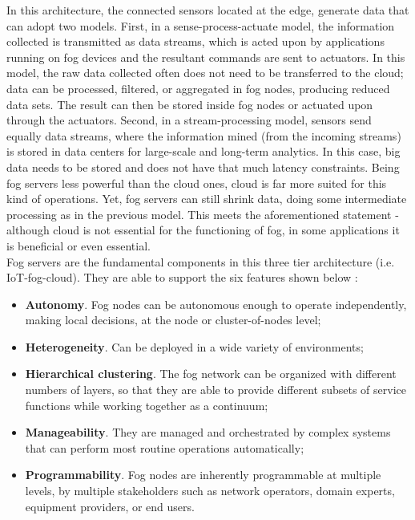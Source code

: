 \noindent\tab In this architecture, the connected sensors located at the edge, generate data that can adopt two models. First, in a sense-process-actuate model, the information collected is transmitted as data streams, which is acted upon by applications running on fog devices and the resultant commands are sent to actuators. In this model, the raw data collected often does not need to be transferred to the cloud; data can be processed, filtered, or aggregated in fog nodes, producing reduced data sets. The result can then be stored inside fog nodes or actuated upon through the actuators. Second, in a stream-processing model, sensors send equally data streams, where the information mined (from the incoming streams) is stored in data centers for large-scale and long-term analytics. In this case, big data needs to be stored and does not have that much latency constraints. Being fog servers less powerful than the cloud ones, cloud is far more suited for this kind of operations. Yet, fog servers can still shrink data, doing some intermediate processing as in the previous model. This meets the aforementioned statement - although cloud is not essential for the functioning of fog, in some applications it is beneficial or even essential.\\
\noindent\tab Fog servers are the fundamental components in this three tier architecture (i.e. IoT-fog-cloud). They are able to support the six features shown below \cite{iorga2018fog}:
\begin{itemize}
	\item \textbf{Autonomy}. Fog nodes can be autonomous enough to operate independently, making local decisions, at the node or cluster-of-nodes level;
	\item \textbf{Heterogeneity}. Can be deployed in a wide variety of environments;
	\item \textbf{Hierarchical clustering}. The fog network can be organized with different numbers of layers, so that they are able to provide different subsets of service functions while working together as a continuum;
	\item \textbf{Manageability}. They are managed and orchestrated by complex systems that can perform most routine operations automatically;
	\item \textbf{Programmability}. Fog nodes are inherently programmable at multiple levels, by multiple stakeholders such as network operators, domain experts, equipment providers, or end users.
\end{itemize}
